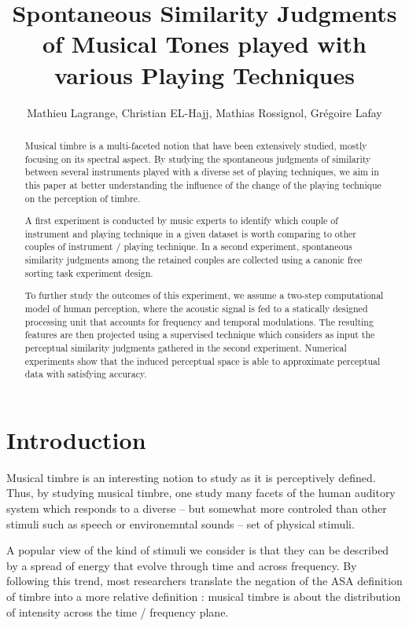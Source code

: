 \documentclass{article}
\title{Spontaneous Similarity Judgments of Musical Tones played with various Playing Techniques}
\author{Mathieu Lagrange, Christian EL-Hajj, Mathias Rossignol, Grégoire Lafay}
\begin{document}
%
\maketitle
%
\begin{abstract}

Musical timbre is a multi-faceted notion that have been extensively studied, mostly focusing on its spectral aspect. By studying the spontaneous judgments of similarity between several instruments played with a diverse set of playing techniques, we aim in this paper at better understanding the influence of the change of the playing technique on the perception of timbre.

A first experiment is conducted by music experts to identify which couple of instrument and playing technique in a given dataset is worth comparing to other couples of instrument / playing technique. In a second experiment, spontaneous similarity judgments among the retained couples are collected using a canonic free sorting task experiment design.


To further study the outcomes of this experiment, we assume a two-step computational model of human perception, where the acoustic signal is fed to a statically designed processing unit that accounts for frequency and temporal modulations. The resulting features are then projected using a supervised technique which considers as input the perceptual similarity judgments gathered in the second experiment. Numerical experiments show that the induced perceptual space is able to approximate perceptual data with satisfying accuracy.

\end{abstract}
%
\section{Introduction}\label{sec:introduction}

Musical timbre is an interesting notion to study as it is perceptively defined. Thus, by studying musical timbre, one study many facets of the human auditory system which responds to a diverse -- but somewhat more controled than other stimuli such as speech or environemntal sounds -- set of physical stimuli.

A popular view of the kind of stimuli we consider is that they can be described by a spread of energy that evolve through time and across frequency. By following this trend, most researchers translate the negation of the ASA definition of timbre into a more relative definition : musical timbre is about the distribution of intensity across the time / frequency plane.
\end{document}
